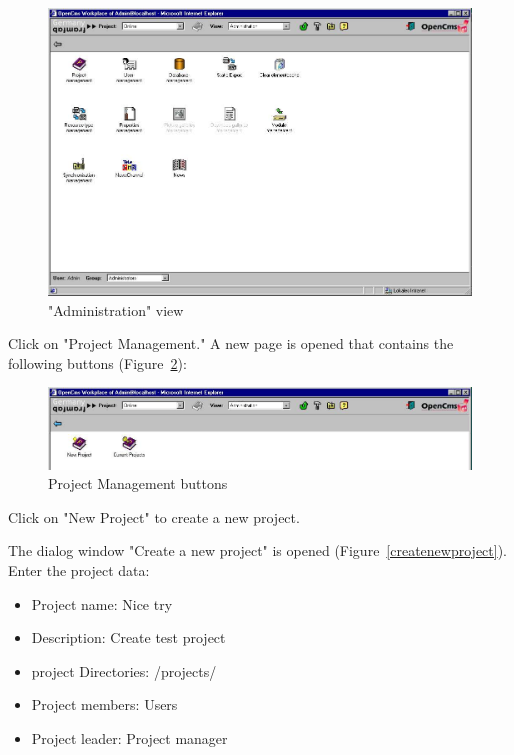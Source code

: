 \begin{figure}[hbt]
\begin{center}
\includegraphics[width=\sgw]
                   {pics/usermanual/adminView}
\caption["Administration" view]
           {"Administration" view}
\label{adminview}
\end{center}
\end{figure}

Click on "Project Management." A new page is opened that contains
the following buttons (Figure~\ref{projectmanager}):

\begin{figure}[hbt]
\begin{center}
\includegraphics[width=\sgw]
                   {pics/usermanual/projectManager}
\caption[Project Management buttons]
           {Project Management buttons}
\label{projectmanager}
\end{center}
\end{figure}

Click on "New Project" to create a new project.

The dialog window "Create a new project" is opened
(Figure~\ref{createnewproject}). Enter the project data:

\begin{itemize}
\item Project name: Nice try
\item Description: Create test project
\item project Directories: /projects/
\item Project members: Users
\item Project leader: Project manager
\end{itemize}

